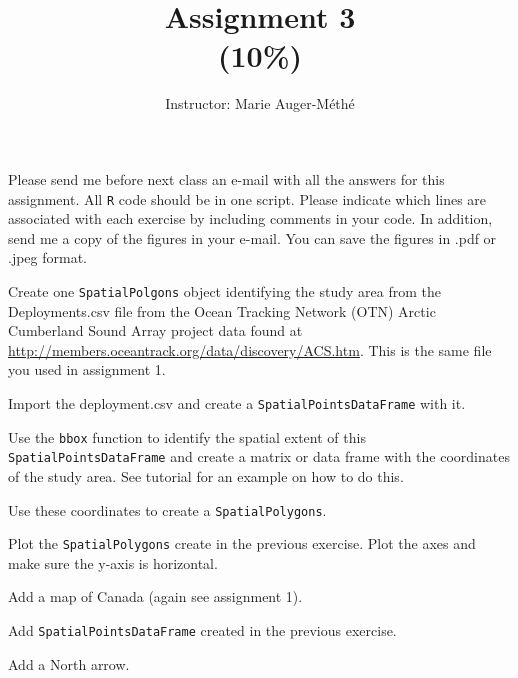\documentclass[11pt, oneside]{article}   	%
\title{Assignment 3 \\ \large(10\%)}
\author{Instructor: Marie Auger-M\'eth\'e}
\date{}							%
\begin{document}
\maketitle

Please send me before next class an e-mail with all the answers for this assignment. All \texttt{R} code should be in one script. Please indicate which lines are associated with each exercise by including comments in your code. In addition, send me a copy of the figures in your e-mail. You can save the figures in .pdf or .jpeg format.

\begin{Exercise}

Create one \texttt{SpatialPolgons} object identifying the study area from the Deployments.csv file from the Ocean Tracking Network (OTN) Arctic Cumberland Sound Array project data found at \url{http://members.oceantrack.org/data/discovery/ACS.htm}. This is the same file you used in assignment 1.

\Question
Import the deployment.csv  and create a \texttt{SpatialPointsDataFrame} with it.

\Question Use the \texttt{bbox} function to  identify the spatial extent of this \texttt{SpatialPointsDataFrame} and create a matrix or data frame with the coordinates of the study area. See tutorial for an example on how to do this.

\Question Use these coordinates to create a \texttt{SpatialPolygons}.

\end{Exercise}

\begin{Exercise}

\Question Plot the \texttt{SpatialPolygons} create in the previous exercise. Plot the axes and make sure the y-axis is horizontal.

\Question Add a map of Canada (again see assignment 1). 

\Question Add \texttt{SpatialPointsDataFrame} created in the previous exercise.

\Question Add a North arrow.

\end{Exercise}
\end{document}
